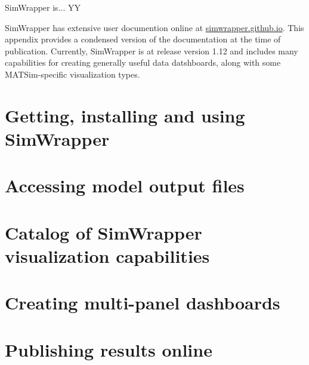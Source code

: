 SimWrapper is... YY

SimWrapper has extensive user documention online at \url{simwrapper.github.io}. This appendix provides a condensed version of the documentation at the time of publication. Currently, SimWrapper is at release version 1.12 and includes many capabilities for creating generally useful data datshboards, along with some MATSim-specific visualization types.

\section{Getting, installing and using SimWrapper}
\label{appendix-simwrapper-install}

\section{Accessing model output files}
\label{appendix-simwrapper-files}

\section{Catalog of SimWrapper visualization capabilities}
\label{appendix-simwrapper-catalog}

\section{Creating multi-panel dashboards}
\label{appendix-simwrapper-dashboards}

\section{Publishing results online}
\label{appendix-simwrapper-publishing}
